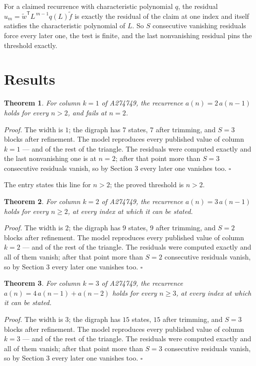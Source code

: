 \documentclass[11pt]{article}
\newtheorem{theorem}{Theorem}
\theoremstyle{definition}
\begin{document}
For a claimed recurrence with characteristic polynomial $q$, the residual $u_m = \tilde w^{\mathsf T}L^{\,m-1}q(L)\tilde f$ is exactly the residual of the claim at one index and itself satisfies the characteristic polynomial of $L$. So $S$ consecutive vanishing residuals force every later one, the test is finite, and the last nonvanishing residual pins the threshold exactly.

\section{Results}

\begin{theorem} For column $k = 1$ of A274749, the recurrence $a(n) = 2\,a(n-1)$ holds for every $n > 2$, and fails at $n = 2$.\end{theorem}

{\itshape Proof.} The width is $1$; the digraph has $7$ states, $7$ after trimming, and $S = 3$ blocks after refinement. The model reproduces every published value of column $k = 1$ --- and of the rest of the triangle. The residuals were computed exactly and the last nonvanishing one is at $n = 2$; after that point more than $S = 3$ consecutive residuals vanish, so by Section 3 every later one vanishes too. $\square$

The entry states this line for $n > 2$; the proved threshold is $n > 2$.

\begin{theorem} For column $k = 2$ of A274749, the recurrence $a(n) = 3\,a(n-1)$ holds for every $n \ge 2$, at every index at which it can be stated.\end{theorem}

{\itshape Proof.} The width is $2$; the digraph has $9$ states, $9$ after trimming, and $S = 2$ blocks after refinement. The model reproduces every published value of column $k = 2$ --- and of the rest of the triangle. The residuals were computed exactly and all of them vanish; after that point more than $S = 2$ consecutive residuals vanish, so by Section 3 every later one vanishes too. $\square$

\begin{theorem} For column $k = 3$ of A274749, the recurrence $a(n) = 4\,a(n-1) + a(n-2)$ holds for every $n \ge 3$, at every index at which it can be stated.\end{theorem}

{\itshape Proof.} The width is $3$; the digraph has $15$ states, $15$ after trimming, and $S = 3$ blocks after refinement. The model reproduces every published value of column $k = 3$ --- and of the rest of the triangle. The residuals were computed exactly and all of them vanish; after that point more than $S = 3$ consecutive residuals vanish, so by Section 3 every later one vanishes too. $\square$
\end{document}
